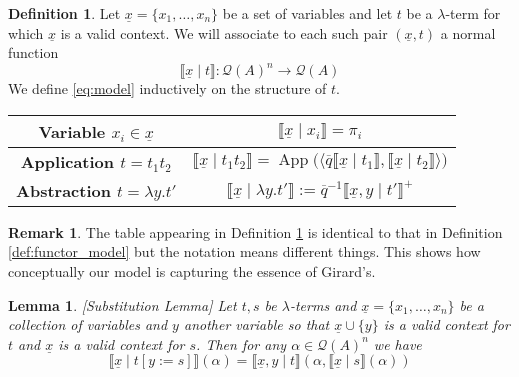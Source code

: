 \documentclass[12pt]{article}
\theoremstyle{plain}
\newtheorem{lemma}[thm]{Lemma}
\theoremstyle{definition}
\newtheorem{defn}[thm]{Definition} %
\newtheorem{remark}[thm]{Remark}
\newcommand{\call}[1]{\mathcal{#1}}
\newcommand{\Qcal}{\call{Q}}
\newcommand{\lto}{\longrightarrow}
\begin{document}
	\begin{defn}\label{def:the_model}
		Let $\underline{x} = \{ x_1, \ldots, x_n \}$ be a set of variables and let $t$ be a $\lambda$-term for which $\underline{x}$ is a valid context. We will associate to each such pair $(\underline{x}, t)$ a normal function
		\begin{equation}\label{eq:model}
			\llbracket \underline{x} \mid t \rrbracket: \Qcal(A)^n \lto \Qcal(A)
		\end{equation}
		We define \eqref{eq:model} inductively on the structure of $t$.
		\begin{center}
			\begin{tabular}{ | c | c | }
			\hline
				\textbf{Variable $x_i \in \underline{x}$} & 
				$\llbracket \underline{x} \mid x_i \rrbracket = \pi_i$\\
				\hline
\textbf{Application $t = t_1 t_2$} & $\llbracket \underline{x} \mid t_1t_2\rrbracket = \operatorname{App}\big( \langle \overline{q} \llbracket \underline{x} \mid t_1 \rrbracket, \llbracket \underline{x} \mid t_2 \rrbracket \rangle \big)$\\
\hline
\textbf{Abstraction $t = \lambda y. t'$} & $\llbracket \underline{x} \mid \lambda y. t' \rrbracket := \overline{q}^{-1} \llbracket \underline{x}, y \mid t' \rrbracket^+$\\
\hline
			\end{tabular}
		\end{center}
	\end{defn}
	\begin{remark}
The table appearing in Definition \ref{def:the_model} is identical to that in Definition \ref{def:functor_model} but the notation means different things. This shows how conceptually our model is capturing the essence of Girard's.
	\end{remark}
	
	\begin{lemma}\label{lem:substitution}[Substitution Lemma]
		Let $t,s$ be $\lambda$-terms and $\underline{x} = \{ x_1, \ldots, x_{n} \}$ be a collection of variables and $y$ another variable so that $\underline{x} \cup \{ y \}$ is a valid context for $t$ and $\underline{x}$ is a valid context for $s$. Then for any $\alpha\in \Qcal(A)^{n}$ we have
		\begin{equation}\label{eq:sub_lem_cond}
			\llbracket \underline{x} \mid t[y := s]\rrbracket(\alpha) = \llbracket \underline{x}, y \mid t \rrbracket(\alpha, \llbracket \underline{x} \mid s \rrbracket (\alpha))
			\end{equation}
		\end{lemma}
	
\end{document}
